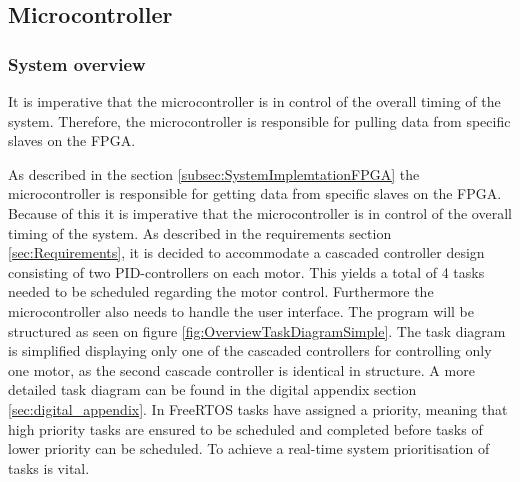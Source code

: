 \documentclass[../../main.tex]{subfiles}
\begin{document}
\subsection{Microcontroller} \label{subsec:SystemImplementationMicroController}

\subsubsection*{System overview}
\label{subsec:SystemImplementationOperatingSystem}
It is imperative that the microcontroller is in control of the overall timing of the system. Therefore, the microcontroller is responsible for pulling data from specific slaves on the FPGA.

As described in the section \ref{subsec:SystemImplemtationFPGA} the microcontroller is responsible for getting data from specific slaves on the FPGA. Because of this it is imperative that the microcontroller is in control of the overall timing of the system. As described in the requirements section \ref{sec:Requirements}, it is decided to accommodate a cascaded controller design consisting of two PID-controllers on each motor. This yields a total of 4 tasks needed to be scheduled regarding the motor control. Furthermore the microcontroller also needs to handle the user interface. The program will be structured as seen on figure \ref{fig:OverviewTaskDiagramSimple}. The task diagram is simplified displaying only one of the cascaded controllers for controlling only one motor, as the second cascade controller is identical in structure. A more detailed task diagram can be found in the digital appendix section \ref{sec:digital_appendix}. In FreeRTOS tasks have assigned a priority, meaning that high priority tasks are ensured to be scheduled and completed before tasks of lower priority can be scheduled. To achieve a real-time system prioritisation of tasks is vital.





\end{document}
